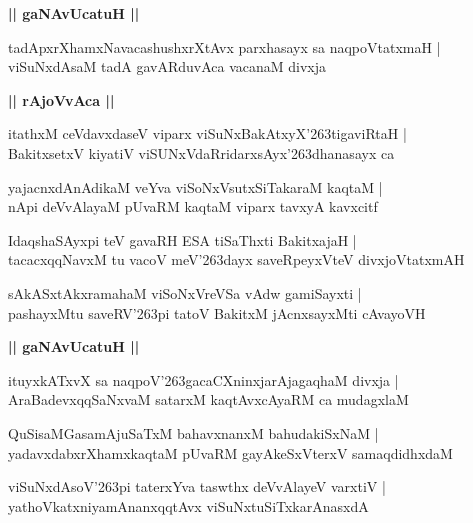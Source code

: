 \documentclass[twoside,12pt,openright]{book}
\def\S{\char'263}
\newcounter{shloka}[chapter]
\def\uvaca#1{\centerline{{\large\textbf{#1}}}}
\begin{document}
\uvaca{|| gaNAvUcatuH ||}

\begin{shloka}%
tadApxrXhamxNavacashushxrXtAvx parxhasayx sa naqpoVtatxmaH |\\
viSuNxdAsaM tadA gavARduvAca vacanaM divxja
\end{shloka}

\uvaca{|| rAjoVvAca ||}

\begin{shloka}%
itathxM ceVdavxdaseV viparx viSuNxBakAtxyX\S tigaviRtaH |\\
BakitxsetxV kiyatiV viSUNxVdaRridarxsAyx\S dhanasayx ca 
\end{shloka}

\begin{shloka}%
yajacnxdAnAdikaM veYva viSoNxVsutxSiTakaraM kaqtaM |\\
nApi deVvAlayaM pUvaRM kaqtaM viparx tavxyA kavxcitf 
\end{shloka}

\begin{shloka}%
IdaqshaSAyxpi teV gavaRH ESA tiSaThxti BakitxajaH |\\
tacacxqqNavxM tu vacoV meV\S dayx saveRpeyxVteV divxjoVtatxmAH 
\end{shloka}

\begin{shloka}%
sAkASxtAkxramahaM viSoNxVreVSa vAdw gamiSayxti |\\
pashayxMtu saveRV\S pi tatoV BakitxM jAcnxsayxMti cAvayoVH 
\end{shloka}

\uvaca{|| gaNAvUcatuH ||}

\begin{shloka}%
ituyxkATxvX sa naqpoV\S gacaCXninxjarAjagaqhaM divxja |\\
AraBadevxqqSaNxvaM satarxM kaqtAvxcAyaRM ca mudagxlaM 
\end{shloka}

\begin{shloka}%
QuSisaMGasamAjuSaTxM bahavxnanxM bahudakiSxNaM |\\
yadavxdabxrXhamxkaqtaM pUvaRM gayAkeSxVterxV samaqdidhxdaM 
\end{shloka}

\begin{shloka}%
viSuNxdAsoV\S pi taterxYva taswthx deVvAlayeV varxtiV |\\
yathoVkatxniyamAnanxqqtAvx viSuNxtuSiTxkarAnasxdA 
\end{shloka}
\end{document}
